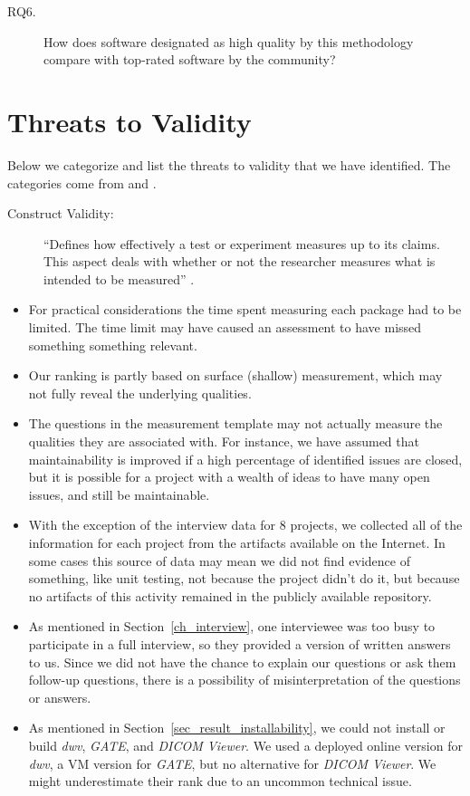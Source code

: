\documentclass[final, 3p, times, authoryear]{elsarticle}
\begin{document}
\begin{description}
\item[RQ6.] How does software designated as high quality by this methodology
compare with top-rated software by the community?
\end{description}

\section{Threats to Validity} \label{sec_threats_to_validity}

Below we categorize and list the threats to validity that we have identified.
The categories come from \citet{AmpatzoglouEtAl2019} and \citet{ZhouEtAl2016}.

\begin{description}
    \item[Construct Validity:] ``Defines how effectively a test or experiment measures
    up to its claims. This aspect deals with whether or not the researcher measures
    what is intended to be measured'' \citep{AmpatzoglouEtAl2019}.
\end{description}

\begin{itemize}
\item For practical considerations the time spent measuring each package had to
be limited.  The time limit may have caused an assessment to have missed
something something relevant.
\item Our ranking is partly based on surface (shallow) measurement, which may
not fully reveal the underlying qualities.
\item The questions in the measurement template may not actually measure the
qualities they are associated with.  For instance, we have assumed that
maintainability is improved if a high percentage of identified issues are
closed, but it is possible for a project with a wealth of ideas to have many
open issues, and still be maintainable.
\item With the exception of the interview data for 8 projects, we collected all
of the information for each project from the artifacts available on the
Internet. In some cases this source of data may mean we did not find evidence of
something, like unit testing, not because the project didn't do it, but because
no artifacts of this activity remained in the publicly available repository.
\item As mentioned in Section~\ref{ch_interview}, one interviewee was too busy
to participate in a full interview, so they provided a version of written answers
to us. Since we did not have the chance to explain our questions or ask them
follow-up questions, there is a possibility of misinterpretation of the
questions or answers.
\item As mentioned in Section~\ref{sec_result_installability}, we could not
install or build \textit{dwv}, \textit{GATE}, and \textit{DICOM Viewer}. We used
a deployed online version for \textit{dwv}, a VM version for \textit{GATE}, but
no alternative for \textit{DICOM Viewer}. We might underestimate their rank due
to an uncommon technical issue.
\end{itemize}
\end{document}
